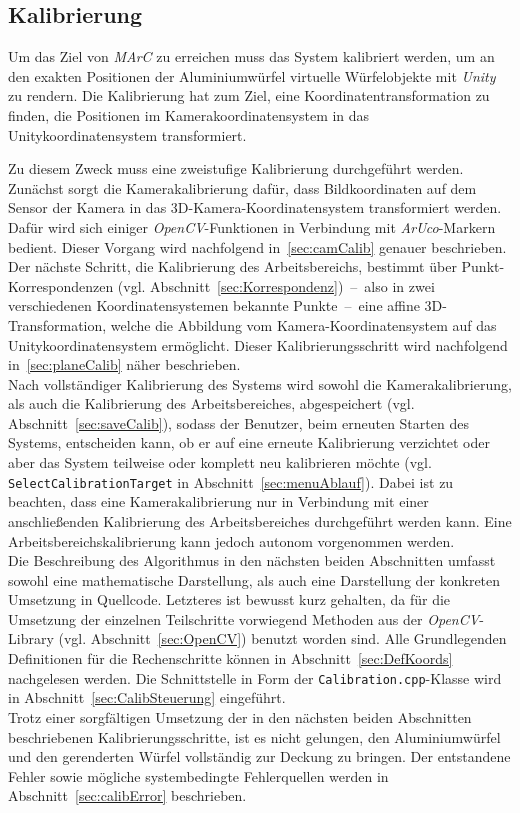 \subsection{Kalibrierung}\label{sec:calib}
Um das Ziel von \textit{MArC} zu erreichen muss das System kalibriert werden, um an den exakten Positionen der Aluminiumwürfel virtuelle Würfelobjekte mit \textit{Unity} zu rendern. Die Kalibrierung hat zum Ziel, eine Koordinatentransformation zu finden, die Positionen im Kamerakoordinatensystem in das Unitykoordinatensystem transformiert.

Zu diesem Zweck muss eine zweistufige Kalibrierung durchgeführt werden. Zunächst sorgt die Kamerakalibrierung dafür, dass Bildkoordinaten auf dem Sensor der Kamera in das 3D-Kamera-Koordinatensystem transformiert werden. Dafür wird sich einiger \textit{OpenCV}-Funktionen in Verbindung mit \textit{ArUco}-Markern bedient. Dieser Vorgang wird nachfolgend in~\ref{sec:camCalib} genauer beschrieben.\\
Der nächste Schritt, die Kalibrierung des Arbeitsbereichs, bestimmt über Punkt-Korrespondenzen (vgl. Abschnitt~\ref{sec:Korrespondenz})~--~also in zwei verschiedenen Koordinatensystemen bekannte Punkte~--~eine affine 3D-Transformation, welche die Abbildung vom Kamera-Koordinaten\-system auf das Unitykoordinatensystem ermöglicht. Dieser Kalibrierungsschritt wird nachfolgend in~\ref{sec:planeCalib} näher beschrieben.\\
Nach vollständiger Kalibrierung des Systems wird sowohl die Kamerakalibrierung, als auch die Kalibrierung des Arbeitsbereiches, abgespeichert (vgl. Abschnitt~\ref{sec:saveCalib}), sodass der Benutzer, beim erneuten Starten des Systems, entscheiden kann, ob er auf eine erneute Kalibrierung verzichtet oder aber das System teilweise oder komplett neu kalibrieren möchte (vgl. \texttt{Select\-Calibration\-Target} in Abschnitt~\ref{sec:menuAblauf}). Dabei ist zu beachten, dass eine Kamerakalibrierung nur in Verbindung mit einer anschließenden Kalibrierung des Arbeitsbereiches durchgeführt werden kann. Eine Arbeitsbereichskalibrierung kann jedoch autonom vorgenommen werden. \\
Die Beschreibung des Algorithmus in den nächsten beiden Abschnitten umfasst sowohl eine mathematische Darstellung, als auch eine Darstellung der konkreten Umsetzung in Quellcode. Letzteres ist bewusst kurz gehalten, da für die Umsetzung der einzelnen Teilschritte vorwiegend Methoden aus der \textit{OpenCV}-Library (vgl. Abschnitt~\ref{sec:OpenCV}) benutzt worden sind. Alle Grundlegenden Definitionen für die Rechenschritte können in Abschnitt~\ref{sec:DefKoords} nachgelesen werden. Die Schnittstelle in Form der \texttt{Calibration.cpp}-Klasse wird in Abschnitt~\ref{sec:CalibSteuerung} eingeführt.\\
Trotz einer sorgfältigen Umsetzung der in den nächsten beiden Abschnitten beschriebenen Kalibrierungsschritte, ist es nicht gelungen, den Aluminiumwürfel und den gerenderten Würfel vollständig zur Deckung zu bringen. Der entstandene Fehler sowie mögliche systembedingte Fehlerquellen werden in Abschnitt~\ref{sec:calibError} beschrieben. 

